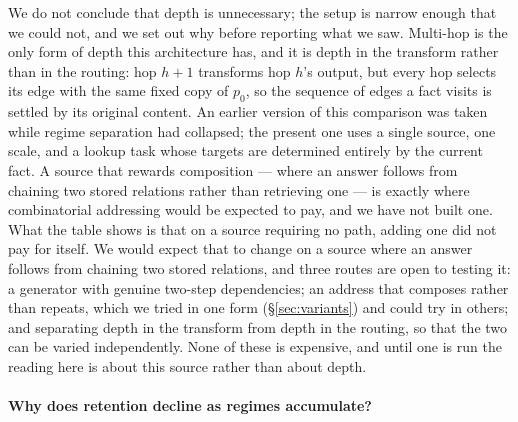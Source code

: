 \documentclass[11pt,a4paper]{article}
\begin{document}
We do not conclude that depth is unnecessary; the setup is narrow enough that
we could not, and we set out why before reporting what we saw. Multi-hop is the only form of depth this architecture has,
and it is depth in the transform rather than in the routing: hop $h+1$
transforms hop $h$'s output, but every hop selects its edge with the same fixed
copy of $p_0$, so the sequence of edges a fact visits is settled by its original
content. An earlier version of this comparison was taken while regime
separation had collapsed; the present one uses a single source, one scale, and a lookup task
whose targets are determined entirely by the current fact. A source that
rewards composition --- where an answer follows from chaining two stored
relations rather than retrieving one --- is exactly where combinatorial
addressing would be expected to pay, and we have not built one. What the table
shows is that on a source requiring no path, adding one did not pay for itself.
We would expect that to change on a source where an answer follows from
chaining two stored relations, and three routes are open to testing it: a
generator with genuine two-step dependencies; an address that composes rather
than repeats, which we tried in one form (\S\ref{sec:variants}) and could try
in others; and separating depth in the transform from depth in the routing, so
that the two can be varied independently. None of these is expensive, and until
one is run the reading here is about this source rather than about depth.

\paragraph{Why does retention decline as regimes accumulate?}
\label{sec:scale}
\end{document}
